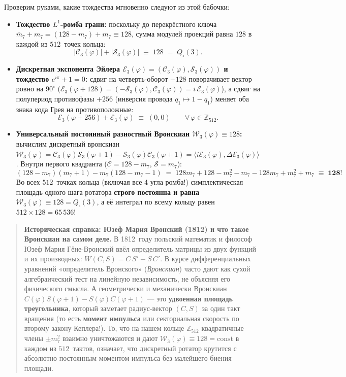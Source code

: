 Проверим руками, какие тождества мгновенно следуют из этой бабочки:
\begin{itemize}[leftmargin=*]
\item \textbf{Тождество $L^1$-ромба грани:} поскольку до перекрёстного ключа $\overline{m}_7 + m_7 = (128 - m_7) + m_7 \equiv 128$, сумма модулей проекций равна $128$ в каждой из $512$~точек кольца:
  \[
    |\mathcal{C}_3(\varphi)| + |\mathcal{S}_3(\varphi)| \;\equiv\; 128 \;=\; Q_\square(3).
  \]
\item \textbf{Дискретная экспонента Эйлера $\mathcal{E}_3(\varphi) = (\mathcal{C}_3(\varphi),\mathcal{S}_3(\varphi))$ и тождество $e^{i\pi} + 1 = 0$:}
  сдвиг на четверть-оборот $+128$ поворачивает вектор ровно на $90^\circ$ ($\mathcal{E}_3(\varphi+128) = (-\mathcal{S}_3(\varphi),\mathcal{C}_3(\varphi)) = i\,\mathcal{E}_3(\varphi)$), а сдвиг на полупериод противофазы $+256$ (инверсия провода $q_1 \mapsto 1 - q_1$) меняет оба знака кода Грея на противоположные:
  \[
    \mathcal{E}_3(\varphi + 256) + \mathcal{E}_3(\varphi) \;\equiv\; (0, 0) \qquad \forall\,\varphi\in\mathbb{Z}_{512}.
  \]
\item \textbf{Универсальный постоянный разностный Вронскиан $\mathcal{W}_3(\varphi)\equiv 128$:}
  вычислим дискретный вронскиан $\mathcal{W}_3(\varphi) = \mathcal{C}_3(\varphi)\mathcal{S}_3(\varphi+1) - \mathcal{S}_3(\varphi)\mathcal{C}_3(\varphi+1) = \langle i\mathcal{E}_3(\varphi),\Delta\mathcal{E}_3(\varphi)\rangle$. Внутри первого квадранта ($\mathcal{C}=128-m_7$, $\mathcal{S}=m_7$):
  \[
    (128 - m_7)(m_7 + 1) - m_7(128 - m_7 - 1)
    \;=\; 128m_7 + 128 - m_7^2 - m_7 - 128m_7 + m_7^2 + m_7
    \;\equiv\; \mathbf{128}!
  \]
  Во всех $512$~точках кольца (включая все 4 угла ромба!) симплектическая площадь одного шага ротатора \textbf{строго постоянна и равна $\mathcal{W}_3(\varphi) \equiv 128 = Q_\square(3)$}, а её интеграл по всему кольцу равен $512 \times 128 = 65\,536$!
\end{itemize}

\begin{quote}
\small\textbf{Историческая справка: Юзеф Мария Вронский (1812) и что такое Вронскиан на самом деле.}
В 1812~году польский математик и философ Юзеф Мария Гёне-Вронский ввёл определитель матрицы из двух функций и их производных: $W(C, S) = C\,S' - S\,C'$. В курсе дифференциальных уравнений «определитель Вронского» (\emph{Вронскиан}) часто дают как сухой алгебраический тест на линейную независимость, не объясняя его физического смысла. А геометрически и механически Вронскиан $C(\varphi)S(\varphi+1) - S(\varphi)C(\varphi+1)$ --- это \textbf{удвоенная площадь треугольника}, который заметает радиус-вектор $(C, S)$ за один такт вращения (то есть \textbf{момент импульса} или секториальная скорость по второму закону Кеплера!). То, что на нашем кольце $\mathbb{Z}_{512}$ квадратичные члены $\pm m_7^2$ взаимно уничтожаются и дают $\mathcal{W}_3(\varphi) \equiv 128 = \mathrm{const}$ в каждом из $512$~тактов, означает, что дискретный ротатор крутится с абсолютно постоянным моментом импульса без малейшего биения площади.
\end{quote}

